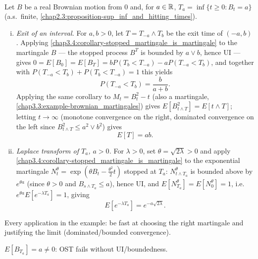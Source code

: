 \begin{example} \label{chap3.4:example-ost_applications}  \\
Let $B$ be a real Brownian motion from $0$ and, for $a\in\mathbb{R}$, $T_a=\inf\{t\ge0:B_t=a\}$ (a.s.\ finite, \cref{chap2.3:proposition-sup_inf_and_hitting_times}).
\begin{enumerate}[(i)]
    \item \textit{Exit of an interval.} For $a,b>0$, let $T=T_{-a}\wedge T_b$ be the exit time of $(-a,b)$. Applying \cref{chap3.4:corollary-stopped_martingale_is_martingale} to the martingale $B$ --- the stopped process $B^T$ is bounded by $a\vee b$, hence UI --- gives $0=E[B_0]=E[B_T]=bP(T_b<T_{-a})-aP(T_{-a}<T_b)$, and together with $P(T_{-a}<T_b)+P(T_b<T_{-a})=1$ this yields
    $$P(T_{-a}<T_b)=\frac{b}{a+b}.$$
    Applying the same corollary to $M_t=B_t^2-t$ (also a martingale, \cref{chap3.3:example-brownian_martingales}) gives $E[B_{t\wedge T}^2]=E[t\wedge T]$; letting $t\to\infty$ (monotone convergence on the right, dominated convergence on the left since $B_{t\wedge T}^2\le a^2\vee b^2$) gives
    $$E[T]=ab.$$
    \item \textit{Laplace transform of $T_a$, $a>0$.} For $\lambda>0$, set $\theta=\sqrt{2\lambda}>0$ and apply \cref{chap3.4:corollary-stopped_martingale_is_martingale} to the exponential martingale $N^\theta_t=\exp(\theta B_t-\tfrac{\theta^2}2t)$ stopped at $T_a$: $N^\theta_{t\wedge T_a}$ is bounded above by $e^{\theta a}$ (since $\theta>0$ and $B_{s\wedge T_a}\le a$), hence UI, and $E[N^\theta_{T_a}]=E[N^\theta_0]=1$, i.e.\ $e^{\theta a}E[e^{-\lambda T_a}]=1$, giving
    $$E[e^{-\lambda T_a}]=e^{-a\sqrt{2\lambda}}.$$
\end{enumerate}
\end{example}
\begin{quizbox} Every application in the example: be fast at choosing the right martingale and justifying the limit (dominated/bounded convergence). \end{quizbox}
\begin{trap} $E[B_{T_a}]=a\ne0$: OST fails without UI/boundedness. \end{trap}
